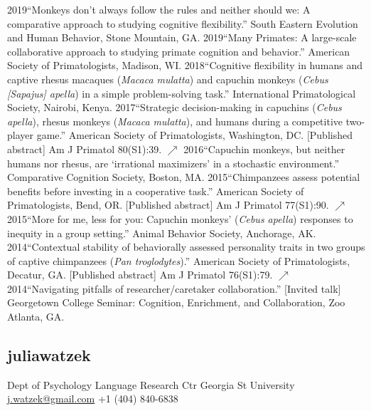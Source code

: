 \documentclass[]{friggeri-cv}
\begin{document}
\begin{entrylist2}
  \entrytwo
    {2019}{``Monkeys don't always follow the rules and neither should we: A comparative approach to studying cognitive flexibility.'' South Eastern Evolution and Human Behavior, Stone Mountain, GA.}
  \entrytwo
    {2019}{``Many Primates: A large-scale collaborative approach to studying primate cognition and behavior.'' American Society of Primatologists, Madison, WI.}
  \entrytwo
    {2018}{``Cognitive flexibility in humans and captive rhesus macaques (\emph{Macaca mulatta}) and capuchin monkeys (\emph{Cebus [Sapajus] apella}) in a simple problem-solving task.'' International Primatological Society, Nairobi, Kenya.}
  \entrytwo
    {2017}{``Strategic decision-making in capuchins (\emph{Cebus apella}), rhesus monkeys (\emph{Macaca mulatta}), and humans during a competitive two-player game.'' American Society of Primatologists, Washington, DC. [Published abstract] Am J Primatol 80(S1):39. \href{https://doi.org/10.1002/ajp.22942}{\small $\nearrow$}}
  \entrytwo
    {2016}{``Capuchin monkeys, but neither humans nor rhesus, are `irrational maximizers' in a stochastic environment.'' Comparative Cognition Society, Boston, MA.}
  \entrytwo
    {2015}{``Chimpanzees assess potential benefits before investing in a cooperative task.'' American Society of Primatologists, Bend, OR. [Published abstract] Am J Primatol 77(S1):90. \href{https://doi.org/10.1002/ajp.22494}{\small $\nearrow$}}
  \entrytwo
    {2015}{``More for me, less for you: Capuchin monkeys' (\emph{Cebus apella}) responses to inequity in a group setting.'' Animal Behavior Society, Anchorage, AK.}
  \entrytwo
    {2014}{``Contextual stability of behaviorally assessed personality traits in two groups of captive chimpanzees (\emph{Pan troglodytes}).'' American Society of Primatologists, Decatur, GA. [Published abstract] Am J Primatol 76(S1):79. \href{https://doi.org/10.1002/ajp.22382}{\small $\nearrow$}}
  \entrytwo
    {2014}{``Navigating pitfalls of researcher/caretaker collaboration.'' [Invited talk] Georgetown College Seminar: Cognition, Enrichment, and Collaboration, Zoo Atlanta, GA.}
\end{entrylist2}

\begin{aside}
  \section{{\normalfont julia}watzek}
    Dept of Psychology
    Language Research Ctr
    Georgia St University
    ~
    \href{mailto:j.watzek@gmail.com}{j.watzek@gmail.com}
    +1 (404) 840-6838
\end{aside}
\end{document}
